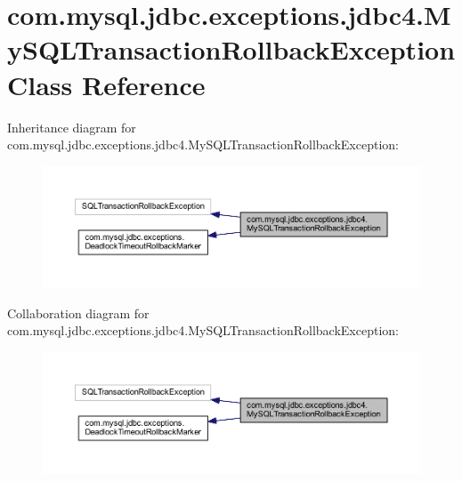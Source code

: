 \hypertarget{classcom_1_1mysql_1_1jdbc_1_1exceptions_1_1jdbc4_1_1_my_s_q_l_transaction_rollback_exception}{}\section{com.\+mysql.\+jdbc.\+exceptions.\+jdbc4.\+My\+S\+Q\+L\+Transaction\+Rollback\+Exception Class Reference}
\label{classcom_1_1mysql_1_1jdbc_1_1exceptions_1_1jdbc4_1_1_my_s_q_l_transaction_rollback_exception}


Inheritance diagram for com.\+mysql.\+jdbc.\+exceptions.\+jdbc4.\+My\+S\+Q\+L\+Transaction\+Rollback\+Exception\+:
\nopagebreak
\begin{figure}[H]
\begin{center}
\leavevmode
\includegraphics[width=350pt]{classcom_1_1mysql_1_1jdbc_1_1exceptions_1_1jdbc4_1_1_my_s_q_l_transaction_rollback_exception__inherit__graph}
\end{center}
\end{figure}


Collaboration diagram for com.\+mysql.\+jdbc.\+exceptions.\+jdbc4.\+My\+S\+Q\+L\+Transaction\+Rollback\+Exception\+:
\nopagebreak
\begin{figure}[H]
\begin{center}
\leavevmode
\includegraphics[width=350pt]{classcom_1_1mysql_1_1jdbc_1_1exceptions_1_1jdbc4_1_1_my_s_q_l_transaction_rollback_exception__coll__graph}
\end{center}
\end{figure}
